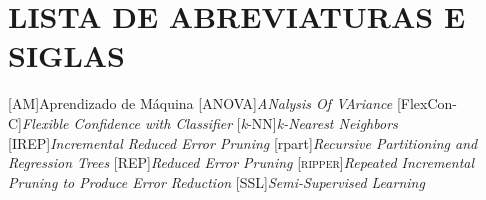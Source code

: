 \thispagestyle{empty}

\chapter*{\normalsize{\textbf{LISTA DE ABREVIATURAS E SIGLAS}}}

\begin{acronym}[]
    [AM]{Aprendizado de Máquina}
    [ANOVA]{\textit{ANalysis Of VAriance}}
    [FlexCon\hyp{C}]{\textit{Flexible Confidence with Classifier}}
    [\textit{k}\hyp{NN}]{\textit{\textit{k}\hyp{Nearest} Neighbors}}
    [IREP]{\textit{Incremental Reduced Error Pruning}}
    [rpart]{\textit{Recursive Partitioning and Regression Trees}}
    [REP]{\textit{Reduced Error Pruning}}
    [\textsc{ripper}]{\textit{Repeated Incremental Pruning to Produce Error Reduction}}
    [SSL]{\textit{Semi\hyp{Supervised} Learning}}
\end{acronym}

\newpage